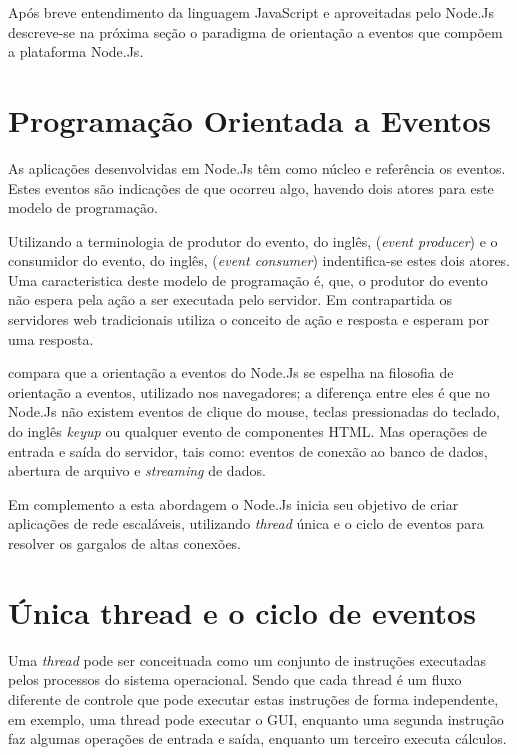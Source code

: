   Após breve entendimento da linguagem JavaScript e aproveitadas pelo Node.Js descreve-se na próxima seção
  o paradigma de orientação a eventos que compõem a plataforma Node.Js.
  
  
\section{Programação Orientada a Eventos}
\label{programacao-orientada-a-eventos}

  
  As aplicações desenvolvidas em Node.Js têm como núcleo e referência os eventos. Estes eventos são indicações de que ocorreu algo, 
  havendo dois atores para este modelo de programação.\cite{Oliveira:2012}
  
  Utilizando a terminologia de produtor do evento, do inglês, (\textit{event producer}) 
  e o consumidor do evento, do inglês, (\textit{event consumer}) indentifica-se estes dois atores. 
  Uma caracteristica deste modelo de programação é, que, o produtor do evento não espera pela ação a ser executada  pelo servidor. 
  Em contrapartida os servidores web tradicionais utiliza o conceito de ação e resposta e esperam por uma resposta.\cite{Junior:2012}  
  
   compara que a orientação a eventos do Node.Js se espelha na filosofia de orientação 
  a eventos, utilizado nos navegadores; a diferença entre eles é que no Node.Js 
  não existem eventos de clique do mouse, teclas pressionadas do teclado, do inglês \textit{keyup} ou qualquer evento de componentes HTML. 
  Mas operações de entrada e saída do servidor, tais como: eventos de conexão ao banco de dados, abertura de arquivo e \textit{streaming}
  de dados.

  Em complemento a esta abordagem o Node.Js inicia seu objetivo de criar aplicações de rede escaláveis, utilizando \textit{thread} única
  e o ciclo de eventos para resolver os gargalos de altas conexões.

\section{Única thread e o ciclo de eventos}
\label{single-thread}

  Uma \textit{thread} pode ser conceituada como um conjunto de instruções executadas pelos processos do sistema operacional.
  Sendo que cada thread é um fluxo diferente de controle que pode executar estas instruções de forma independente, em exemplo,
  uma thread pode executar o GUI, enquanto uma segunda instrução faz algumas operações de entrada e saída, 
  enquanto um terceiro executa cálculos. \cite{Lewis:1995}
  

